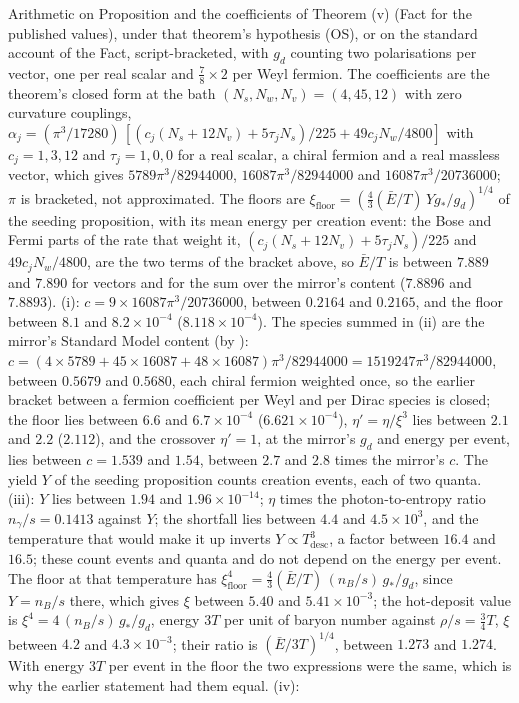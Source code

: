Arithmetic on Proposition  and the coefficients of Theorem (v) (Fact  for the published values), under that theorem's hypothesis (OS), or on the standard account of the Fact, script-bracketed, with $g_{d}$ counting two polarisations per vector, one per real scalar and $\tfrac{7}{8} \times 2$ per Weyl fermion. The coefficients are the theorem's closed form at the bath $(N_{s}, N_{w}, N_{v}) = (4, 45, 12)$ with zero curvature couplings, $\alpha_{j} = (\pi^{3}/17280)\,[(c_{j}(N_{s} + 12N_{v}) + 5\tau_{j}N_{s})/225 + 49c_{j}N_{w}/4800]$ with $c_{j} = 1, 3, 12$ and $\tau_{j} = 1, 0, 0$ for a real scalar, a chiral fermion and a real massless vector, which gives $5789\pi^{3}/82944000$, $16087\pi^{3}/82944000$ and $16087\pi^{3}/20736000$; $\pi$ is bracketed, not approximated. The floors are $\xi_{\mathrm{floor}} = (\tfrac43(\bar{E}/T)\,Y g_{*}/g_{d})^{1/4}$ of the seeding proposition, with its mean energy per creation event: the Bose and Fermi parts of the rate that weight it, $(c_{j}(N_{s} + 12N_{v}) + 5\tau_{j}N_{s})/225$ and $49c_{j}N_{w}/4800$, are the two terms of the bracket above, so $\bar{E}/T$ is between $7.889$ and $7.890$ for vectors and for the sum over the mirror's content ($7.8896$ and $7.8893$). (i): $c = 9 \times 16087\pi^{3}/20736000$, between $0.2164$ and $0.2165$, and the floor between $8.1$ and $8.2 \times 10^{-4}$ ($8.118 \times 10^{-4}$). The species summed in (ii) are the mirror's Standard Model content (by ): $c = (4 \times 5789 + 45 \times 16087 + 48 \times 16087)\pi^{3}/82944000 = 1519247\pi^{3}/82944000$, between $0.5679$ and $0.5680$, each chiral fermion weighted once, so the earlier bracket between a fermion coefficient per Weyl and per Dirac species is closed; the floor lies between $6.6$ and $6.7 \times 10^{-4}$ ($6.621 \times 10^{-4}$), $\eta' = \eta/\xi^{3}$ lies between $2.1$ and $2.2$ ($2.112$), and the crossover $\eta' = 1$, at the mirror's $g_{d}$ and energy per event, lies between $c = 1.539$ and $1.54$, between $2.7$ and $2.8$ times the mirror's $c$. The yield $Y$ of the seeding proposition counts creation events, each of two quanta. (iii): $Y$ lies between $1.94$ and $1.96 \times 10^{-14}$; $\eta$ times the photon-to-entropy ratio $n_{\gamma}/s = 0.1413$ against $Y$; the shortfall lies between $4.4$ and $4.5 \times 10^{3}$, and the temperature that would make it up inverts $Y \propto T_{\mathrm{desc}}^{3}$, a factor between $16.4$ and $16.5$; these count events and quanta and do not depend on the energy per event. The floor at that temperature has $\xi_{\mathrm{floor}}^{4} = \tfrac43(\bar{E}/T)\,(n_{B}/s)\,g_{*}/g_{d}$, since $Y = n_{B}/s$ there, which gives $\xi$ between $5.40$ and $5.41 \times 10^{-3}$; the hot-deposit value is $\xi^{4} = 4\,(n_{B}/s)\,g_{*}/g_{d}$, energy $3T$ per unit of baryon number against $\rho/s = \tfrac34 T$, $\xi$ between $4.2$ and $4.3 \times 10^{-3}$; their ratio is $(\bar{E}/3T)^{1/4}$, between $1.273$ and $1.274$. With energy $3T$ per event in the floor the two expressions were the same, which is why the earlier statement had them equal. (iv): 